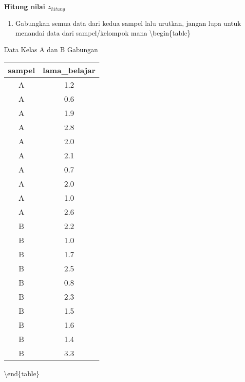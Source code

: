 \documentclass[
]{book}
\providecommand{\tightlist}{%
  \setlength{\itemsep}{0pt}\setlength{\parskip}{0pt}}
\begin{document}
\textbf{Hitung nilai \(z_{hitung}\)}

\begin{enumerate}
\def\labelenumi{\arabic{enumi}.}
\tightlist
\item
  Gabungkan semua data dari kedua sampel lalu urutkan, jangan lupa untuk menandai data dari sampel/kelompok mana
  \textbackslash begin\{table\}
\end{enumerate}

\caption{\label{tab:unnamed-chunk-12}Data Kelas A dan B Gabungan}
\centering
\begin{tabular}[t]{c|c}
\hline
sampel & lama\_belajar\\
\hline
A & 1.2\\
\hline
A & 0.6\\
\hline
A & 1.9\\
\hline
A & 2.8\\
\hline
A & 2.0\\
\hline
A & 2.1\\
\hline
A & 0.7\\
\hline
A & 2.0\\
\hline
A & 1.0\\
\hline
A & 2.6\\
\hline
B & 2.2\\
\hline
B & 1.0\\
\hline
B & 1.7\\
\hline
B & 2.5\\
\hline
B & 0.8\\
\hline
B & 2.3\\
\hline
B & 1.5\\
\hline
B & 1.6\\
\hline
B & 1.4\\
\hline
B & 3.3\\
\hline
\end{tabular}

\textbackslash end\{table\}
\end{document}
